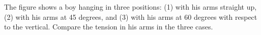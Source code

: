 The figure shows a boy hanging in three positions: (1) with his arms straight up,
(2) with his arms at 45 degrees, and (3) with his arms at 60 degrees with
respect to the vertical. Compare the tension in his arms in the three cases.
